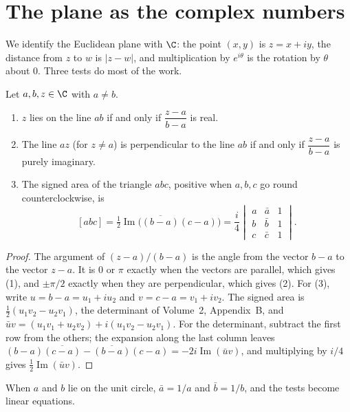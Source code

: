 \section{The plane as the complex numbers}

We identify the Euclidean plane with $\C$: the point $(x,y)$ is $z=x+iy$, the distance from $z$ to $w$ is $|z-w|$, and
multiplication by $e^{i\theta}$ is the rotation by $\theta$ about $0$. Three tests do most of the work.

\begin{proposition}\label{geometry:prop:tests}
Let $a,b,z\in\C$ with $a\ne b$.
\begin{enumerate}
\item $z$ lies on the line $ab$ if and only if $\dfrac{z-a}{b-a}$ is real.
\item The line $az$ (for $z\ne a$) is perpendicular to the line $ab$ if and only if $\dfrac{z-a}{b-a}$ is purely imaginary.
\item The signed area of the triangle $abc$, positive when $a,b,c$ go round counterclockwise, is
\[
[abc]=\tfrac12\operatorname{Im}\bigl(\overline{(b-a)}(c-a)\bigr)=\frac i4\begin{vmatrix}a&\bar a&1\\ b&\bar b&1\\ c&\bar c&1\end{vmatrix}.
\]
\end{enumerate}
\end{proposition}
\begin{proof}
The argument of $(z-a)/(b-a)$ is the angle from the vector $b-a$ to the vector $z-a$. It is $0$ or $\pi$ exactly when the
vectors are parallel, which gives (1), and $\pm\pi/2$ exactly when they are perpendicular, which gives (2). For (3), write
$u=b-a=u_1+iu_2$ and $v=c-a=v_1+iv_2$. The signed area is $\frac12(u_1v_2-u_2v_1)$, the determinant of Volume~2, Appendix~B, and
$\bar uv=(u_1v_1+u_2v_2)+i(u_1v_2-u_2v_1)$. For the determinant, subtract the first row from the others; the expansion
along the last column leaves $(b-a)\overline{(c-a)}-\overline{(b-a)}(c-a)=-2i\operatorname{Im}(\bar uv)$, and multiplying by
$i/4$ gives $\frac12\operatorname{Im}(\bar uv)$.
\end{proof}

When $a$ and $b$ lie on the unit circle, $\bar a=1/a$ and $\bar b=1/b$, and the tests become linear equations.

